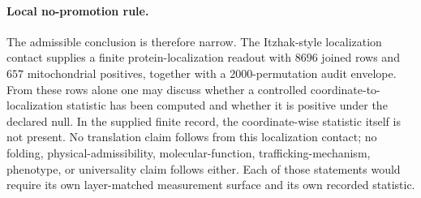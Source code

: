 \paragraph{Local no-promotion rule.}
The admissible conclusion is therefore narrow.  The Itzhak-style localization contact supplies a finite protein-localization readout with $8696$ joined rows and $657$ mitochondrial positives, together with a $2000$-permutation audit envelope.  From these rows alone one may discuss whether a controlled coordinate-to-localization statistic has been computed and whether it is positive under the declared null.  In the supplied finite record, the coordinate-wise statistic itself is not present.  No translation claim follows from this localization contact; no folding, physical-admissibility, molecular-function, trafficking-mechanism, phenotype, or universality claim follows either.  Each of those statements would require its own layer-matched measurement surface and its own recorded statistic.